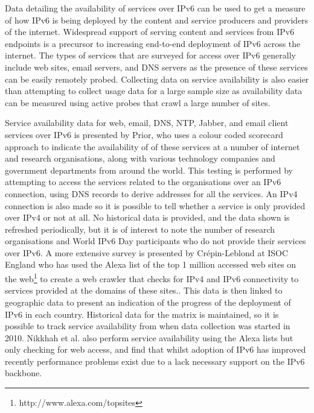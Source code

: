 Data detailing the availability of services over IPv6 can be used to get a
measure of how IPv6 is being deployed by the content and service producers and
providers of the internet. Widespread support of serving content and services
from IPv6 endpoints is a precursor to increasing end-to-end deployment of IPv6
across the internet. The types of services that are surveyed for access over
IPv6 generally include web sites, email servers, and DNS servers
as the presence of these services can be easily remotely probed. Collecting data
on service availability is also easier than attempting to collect usage data
for a large sample size as availability data can be measured using active probes
that crawl a large number of sites.

Service availability data for web, email, DNS, NTP, Jabber, and email client
services over IPv6 is presented by Prior, who uses a colour coded scorecard
approach to indicate the availability of of these services at a number of
internet and research organisations, along with various technology companies and
government departments from around the world\cite{prior_ipv6_2012}. This testing is performed by
attempting to access the services related to the organisations over an IPv6
connection, using DNS records to derive addresses for all the services. An IPv4
connection is also made so it is possible to tell whether a service is only
provided over IPv4 or not at all. No historical data is provided, and the data
shown is refreshed periodically, but it is of interest to note the number of
research organisations and World IPv6 Day participants who do not provide their
services over IPv6. A more extensive survey is presented by Crépin-Leblond at
ISOC England who has used the Alexa list of the top 1 million accessed web
sites on the web\footnote[2]{http://www.alexa.com/topsites}
to create a web crawler that checks for IPv4 and IPv6 connectivity to services provided
at the domains of these sites.\cite{olivier_mj_crepin-leblond_ipv6_2010}. This
data is then linked to geographic data to present an indication of the progress
of the deployment of IPv6 in each country.
Historical data for the matrix is maintained, so it is possible to track service
availability from when data collection was started in 2010. Nikkhah et al. also
perform service availability using the Alexa lists but only checking for
web access, and find that whilst adoption of IPv6 has improved recently
performance problems exist due to a lack necessary support on the IPv6
backbone\cite{nikkhah_assessing_2011}.

